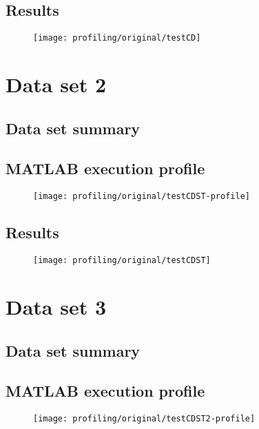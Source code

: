 \subsection{Results}
\begin{figure}[H]
	\centering
	\texttt{[image: profiling/original/testCD]}
\end{figure}

\section{Data set 2}

\subsection{Data set summary}

\subsection{MATLAB execution profile}
\begin{figure}[H]
	\centering
	\texttt{[image: profiling/original/testCDST-profile]}
\end{figure}

\subsection{Results}
\begin{figure}[H]
	\centering
	\texttt{[image: profiling/original/testCDST]}
\end{figure}

\section{Data set 3}

\subsection{Data set summary}

\subsection{MATLAB execution profile}
\begin{figure}[H]
	\centering
	\texttt{[image: profiling/original/testCDST2-profile]}
\end{figure}

